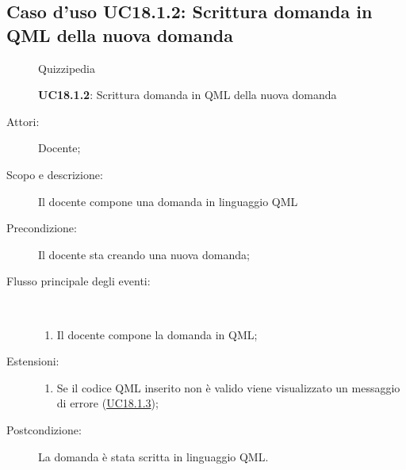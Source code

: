 \subsection{Caso d'uso UC18.1.2: Scrittura domanda in QML della nuova domanda}
\begin{figure}[H]
	\centering
	\begin{resizedtikzpicture}{\textwidth}
		\begin{umlsystem}[x=0, fill=lightgray!20]{Quizzipedia}
		\end{umlsystem}
	\end{resizedtikzpicture}
	\caption{\textbf{UC18.1.2}: Scrittura domanda in QML della nuova domanda}
	\label{UC18.1.2}
\end{figure}
\begin{description}
	\item[Attori:] Docente;
	\item[Scopo e descrizione:] Il docente compone una domanda in linguaggio QML
	\item[Precondizione:] Il docente sta creando una nuova domanda;
	
	\item[Flusso principale degli eventi:] \ 
	\begin{enumerate}
		\item Il docente compone la domanda in QML;
		
	\end{enumerate}
	\item[Estensioni:]
	\begin{enumerate}
		\item Se il codice QML inserito non è valido viene visualizzato un messaggio di errore (\hyperlink{UC18.1.3}{UC18.1.3});
		
	\end{enumerate}
	\item[Postcondizione:] La domanda è stata scritta in linguaggio QML.
\end{description}
\hypertarget{UC18.1.3}{}
